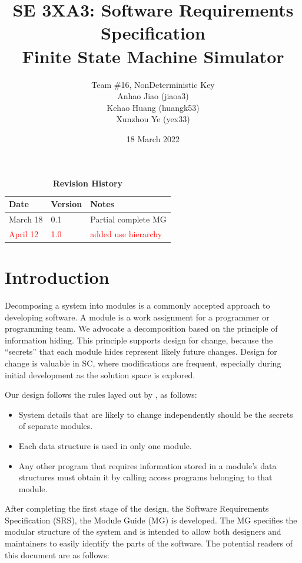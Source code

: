 \documentclass[12pt, titlepage]{article}
\title{SE 3XA3: Software Requirements Specification\\
  Finite State Machine Simulator}
\author{Team \#16, NonDeterministic Key
		\\ Anhao Jiao (jiaoa3)
		\\ Kehao Huang (huangk53)
		\\ Xunzhou Ye (yex33)
}
\date{18 March 2022}
\begin{document}
\maketitle

\tableofcontents
\listoftables
\listoffigures

\begin{table}[H]
  \caption{\bf Revision History}
  \begin{tabularx}{\textwidth}{p{3cm}p{2cm}X}
    \toprule {\bf Date} & {\bf Version} & {\bf Notes}\\
    \midrule
    March 18 & 0.1 & Partial complete MG \\
    \textcolor{red}{April 12} & \textcolor{red}{1.0} & \textcolor{red}{added use
                                                       hierarchy} \\
    \bottomrule
  \end{tabularx}
\end{table}

\newpage


\section{Introduction}

Decomposing a system into modules is a commonly accepted approach to developing
software.  A module is a work assignment for a programmer or programming
team.  We advocate a decomposition
based on the principle of information hiding.  This
principle supports design for change, because the ``secrets'' that each module
hides represent likely future changes.  Design for change is valuable in SC,
where modifications are frequent, especially during initial development as the
solution space is explored.  

Our design follows the rules layed out by , as follows:
\begin{itemize}
\item System details that are likely to change independently should be the
  secrets of separate modules.
\item Each data structure is used in only one module.
\item Any other program that requires information stored in a module's data
  structures must obtain it by calling access programs belonging to that module.
\end{itemize}

After completing the first stage of the design, the Software Requirements
Specification (SRS), the Module Guide (MG) is developed. The MG
specifies the modular structure of the system and is intended to allow both
designers and maintainers to easily identify the parts of the software.  The
potential readers of this document are as follows:
\end{document}
